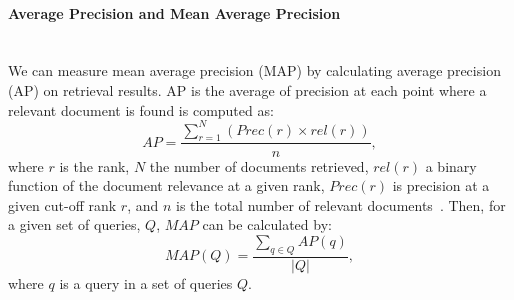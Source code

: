 \paragraph{Average Precision and Mean Average Precision}
\ \\
We can measure mean average precision (MAP) by calculating average precision (AP) on retrieval results. AP is the average of precision at each point where a relevant document is found is computed as:
\begin{equation}
AP=\frac{\sum\limits_{r=1}^{N}(Prec(r)\times rel(r))}{n},
\end{equation}
\noindent
where $ r $ is the rank, $ N $ the number of documents retrieved, $ rel(r) $ a binary function of the document relevance at a given rank, $ Prec(r) $ is precision at a given cut-off rank $ r $, and $ n $ is the total number of relevant documents~\citep{manning2008introduction}.
Then, for a given set of queries, $ Q $, $ MAP $ can be calculated by:
\begin{equation}
MAP(Q)=\frac{\sum\limits_{q\in Q}AP(q)}{|Q|},
\end{equation}
\noindent
where $ q $ is a query in a set of queries $ Q $.